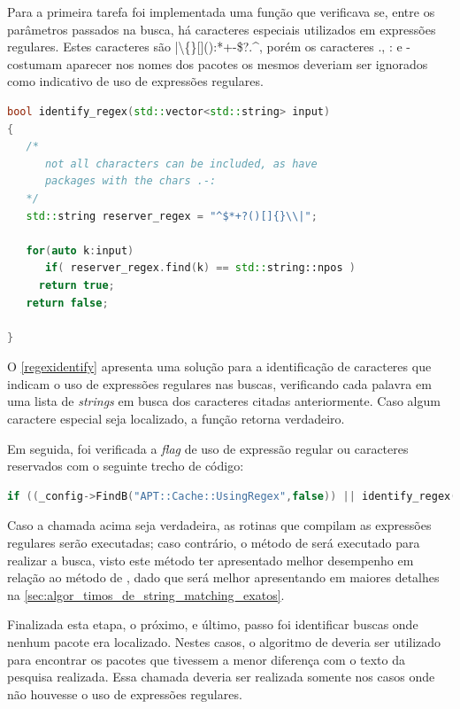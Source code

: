 Para a primeira tarefa foi implementada uma função que verificava se, entre os parâmetros passados na busca, há caracteres especiais utilizados em expressões regulares. Estes caracteres são {\code |\textbackslash\{\}[]():*+-\$?.\^{}}, porém os caracteres {\code .}, {\code :} e {\code -} costumam aparecer nos nomes dos pacotes os mesmos deveriam ser ignorados como indicativo de uso de expressões regulares.

\begin{lstlisting}[language=C++,label=regexidentify,caption={Identificação de Expressões Regulares}]
bool identify_regex(std::vector<std::string> input)
{
   /*
      not all characters can be included, as have
      packages with the chars .-:
   */
   std::string reserver_regex = "^$*+?()[]{}\\|";

   for(auto k:input)
      if( reserver_regex.find(k) == std::string::npos )
	 return true;
   return false;

}
\end{lstlisting}

O \autoref{regexidentify} apresenta uma solução para a identificação de caracteres que indicam o uso de expressões regulares nas buscas, verificando cada palavra em uma lista de \textit{strings} em busca dos caracteres citadas anteriormente. Caso algum caractere especial seja localizado, a função retorna verdadeiro.


Em seguida, foi verificada a \textit{flag} de uso de expressão regular ou caracteres reservados com o seguinte trecho de código:

\begin{lstlisting}[language=C++,basicstyle=\footnotesize\ttfamily,numbers=none]
if ((_config->FindB("APT::Cache::UsingRegex",false)) || identify_regex(args))
\end{lstlisting}

Caso a chamada acima seja verdadeira, as rotinas que compilam as expressões regulares serão executadas; caso contrário, o método de  será executado para realizar a busca, visto este método ter apresentado melhor desempenho em relação ao método de , dado que será melhor apresentando em maiores detalhes na \autoref{sec:algor_timos_de_string_matching_exatos}.


Finalizada esta etapa, o próximo, e último, passo foi identificar buscas onde nenhum pacote era localizado. Nestes casos, o algoritmo de \textit{} deveria ser utilizado para encontrar os pacotes que tivessem a menor diferença com o texto da pesquisa realizada. Essa chamada deveria ser realizada somente nos casos onde não houvesse o uso de expressões regulares.

